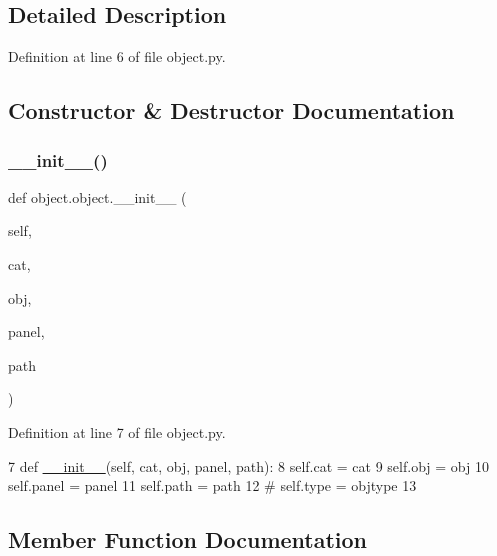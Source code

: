\subsection{Detailed Description}


Definition at line 6 of file object.\+py.



\subsection{Constructor \& Destructor Documentation}
\mbox{\label{classobject_1_1object_aa3f4049602209943ac20eb5c307acb4b}} 
\subsubsection{\texorpdfstring{\+\_\+\+\_\+init\+\_\+\+\_\+()}{\_\_init\_\_()}}
{\footnotesize\ttfamily def object.\+object.\+\_\+\+\_\+init\+\_\+\+\_\+ (\begin{DoxyParamCaption}\item[{}]{self,  }\item[{}]{cat,  }\item[{}]{obj,  }\item[{}]{panel,  }\item[{}]{path }\end{DoxyParamCaption})}



Definition at line 7 of file object.\+py.


\begin{DoxyCode}
7     \textcolor{keyword}{def }\hyperlink{classwrapper_1_1ModuleDictWrapper_a9a7a794150502f51df687831583e13b9}{\_\_init\_\_}(self, cat, obj, panel, path):
8         self.cat   = cat
9         self.obj   = obj
10         self.panel = panel
11         self.path  = path
12 \textcolor{comment}{#        self.type  = objtype}
13         
\end{DoxyCode}


\subsection{Member Function Documentation}
\mbox{\label{classobject_1_1object_a54a55487254a96ed2fe367439c41391f}} 
